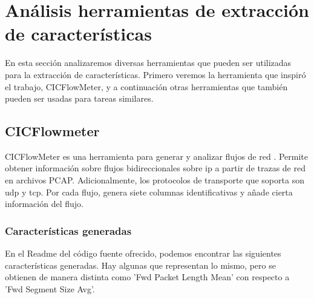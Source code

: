 \section{Análisis herramientas de extracción de características}

En esta sección analizaremos diversas herramientas que pueden ser utilizadas para la extracción de características. Primero veremos la herramienta que inspiró el trabajo, CICFlowMeter, y a continuación otras herramientas que también pueden ser usadas para tareas similares.

\subsection{CICFlowmeter}

CICFlowMeter es una herramienta para generar y analizar flujos de red \cite{cicflowpost} \cite{icissp17} \cite{cicflowrepo}. Permite obtener información sobre flujos bidireccionales sobre \acrshort{ip} a partir de trazas de red en archivos PCAP. Adicionalmente, los protocolos de transporte que soporta son \acrshort{udp} y \acrshort{tcp}. Por cada flujo, genera siete columnas identificativas y añade cierta información del flujo. 

\subsubsection{Características generadas} \label{cicflowfeatures}

En el Readme del código fuente ofrecido, podemos encontrar las siguientes características generadas. Hay algunas que representan lo mismo, pero se obtienen de manera distinta como 'Fwd Packet Length Mean' con respecto a 'Fwd Segment Size Avg'.

